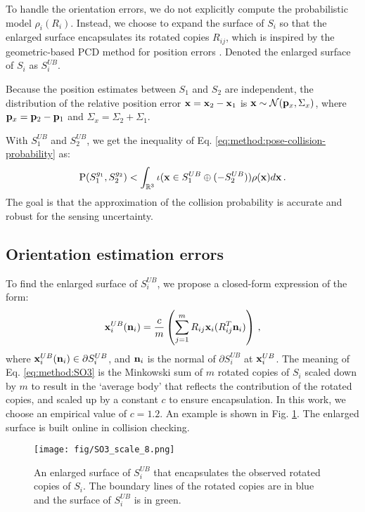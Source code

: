 \documentclass[conference]{IEEEtran}
\newcommand{\IR}{\mathbb{R}}
\newcommand{\xx}{{\bf x}}
\newcommand{\pp}{{\bf p}}
\newcommand{\nn}{{\bf n}}
\newcommand{\PP}{\text{P}}
\begin{document}
To handle the orientation errors, we do not explicitly compute the probabilistic model $\rho_i(R_i)$. Instead, we choose to expand the surface of $S_i$ so that the enlarged surface encapsulates its rotated copies ${R_{ij}}$, which is inspired by the geometric-based PCD method for position errors \cite{dawson2020provably}. Denoted the enlarged surface of $S_i$ as $S_i^{UB}$. 

Because the position estimates between $S_1$ and $S_2$ are independent, the distribution of the relative position error $\xx=\xx_2-\xx_1$ is $\xx \sim \mathcal{N}(\pp_x, \Sigma_x)$, where $\pp_x = \pp_2 - \pp_1$ and $\Sigma_x = \Sigma_2 + \Sigma_1$. 

With $S_1^{UB}$ and $S_2^{UB}$, we get the inequality of Eq. \ref{eq:method:pose-collision-probability} as:
\begin{equation}
 \label{eq:method:pcd-inequality-orientation}
\PP(S_1^{g_1}, S_2^{g_2}) < \int_{\IR^3} \iota(\xx \in S_1^{UB} \oplus (-S_2^{UB})) \rho(\xx)d\xx \, .
\end{equation}
The goal is that the approximation of the collision probability is accurate and robust for the sensing uncertainty. 


\subsection{Orientation estimation errors}
To find the enlarged surface of $S_i^{UB}$, we propose a closed-form expression of the form:
\begin{equation}
\label{eq:method:SO3}
\xx_i^{UB}(\nn_i) = \frac{c}{m} \left( \sum_{j=1}^{m} R_{ij} \xx_i(R_{ij}^T\nn_i) \right) \, ,
\end{equation}
where $\xx_i^{UB}(\nn_i) \in \partial S_i^{UB}$, and $\nn_i$ is the normal of $\partial S_i^{UB}$ at $\xx_i^{UB}$. The meaning of Eq. \ref{eq:method:SO3} is the Minkowski sum of $m$ rotated copies of $S_i$ scaled down by $m$ to result in the ‘average body’ that reflects the contribution of the rotated copies, and scaled up by a constant $c$ to ensure encapsulation. In this work, we choose an empirical value of $c=1.2$. An example is shown in Fig. \ref{fig:method:SO3}. The enlarged surface is built online in collision checking. 

\begin{figure}[tb]
\centering
\texttt{[image: fig/SO3\_scale\_8.png]}
\caption{An enlarged surface of $S_i^{UB}$ that encapsulates the observed rotated copies of $S_i$. The boundary lines of the rotated copies are in blue and the surface of $S_i^{UB}$ is in green. }
\label{fig:method:SO3}
\end{figure}
\end{document}
